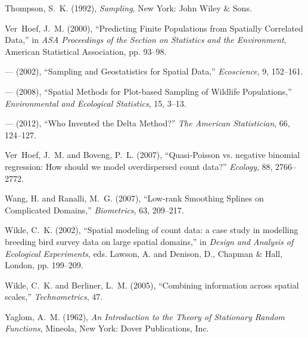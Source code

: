 \documentclass[12pt, titlepage]{article}\usepackage[]{graphicx}\usepackage[]{color}
\begin{document}
\begin{thebibliography}{47}
Thompson, S.~K. (1992), \textit{Sampling}, New York: John Wiley \& Sons.

Ver~Hoef, J.~M. (2000), \enquote{Predicting Finite Populations from Spatially
  Correlated Data,} in \textit{ASA Proceedings of the Section on Statistics and
  the Environment}, American Statistical Association, pp. 93--98.

--- (2002), \enquote{Sampling and Geostatistics for Spatial Data,}
  \textit{Ecoscience}, 9, 152--161.

--- (2008), \enquote{Spatial Methods for Plot-based Sampling of Wildlife
  Populations,} \textit{Environmental and Ecological Statistics}, 15, 3--13.

--- (2012), \enquote{Who Invented the Delta Method?} \textit{The American
  Statistician}, 66, 124--127.

Ver~Hoef, J.~M. and Boveng, P.~L. (2007), \enquote{Quasi-Poisson vs. negative
  binomial regression: How should we model overdispersed count data?}
  \textit{Ecology}, 88, 2766--2772.

Wang, H. and Ranalli, M.~G. (2007), \enquote{Low-rank Smoothing Splines on
  Complicated Domains,} \textit{Biometrics}, 63, 209--217.

Wikle, C.~K. (2002), \enquote{Spatial modeling of count data: a case study in
  modelling breeding bird survey data on large spatial domains,} in
  \textit{Design and Analysis of Ecological Experiments}, eds. Lawson, A. and
  Denison, D., Chapman \& Hall, London, pp. 199--209.

Wikle, C.~K. and Berliner, L.~M. (2005), \enquote{Combining information across
  spatial scales,} \textit{Technometrics}, 47.

Yaglom, A.~M. (1962), \textit{An Introduction to the Theory of Stationary
  Random Functions}, Mineola, New York: Dover Publications, Inc.

\end{thebibliography}
\end{document}
